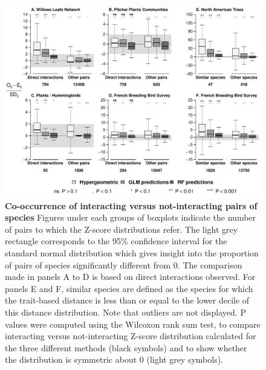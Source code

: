 \begin{figure}[htbp]
\centering
\includegraphics{chapitre3/figIntVsNoint.pdf}
\caption{\textbf{Co-occurrence of interacting versus not-interacting
pairs of species} Figures under each groups of boxplots indicate the
number of pairs to which the Z-score distributions refer. The light grey
rectangle corresponds to the 95\% confidence interval for the standard
normal distribution which gives insight into the proportion of pairs of
species significantly different from 0. The comparison made in panels A
to D is based on direct interactions observed. For panels E and F,
similar species are defined as the species for which the trait-based
distance is less than or equal to the lower decile of this distance
distribution. Note that outliers are not displayed. P values were
computed using the Wilcoxon rank sum test, to compare interacting versus
not-interacting Z-score distribution calculated for the three different
methods (black symbols) and to show whether the distribution is
symmetric about 0 (light grey symbols).\label{fig:synth}}
\end{figure}

\newpage

